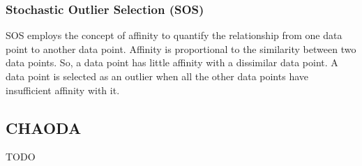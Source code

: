 \subsubsection{Stochastic Outlier Selection (SOS)}
\label{subsubsec:introduction:related-works:sos}
SOS employs the concept of affinity to quantify the relationship from one data point to another data point.
Affinity is proportional to the similarity between two data points.
So, a data point has little affinity with a dissimilar data point.
A data point is selected as an outlier when all the other data points have insufficient affinity with it.
\cite{janssens2012sos}





\subsection{CHAODA}
\label{subsec:introduction:chaoda}

TODO
